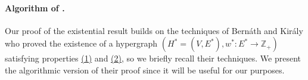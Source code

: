 \documentclass{article}
\def\Cref#1{<#1>}%
\newcommand{\maximalTightSetFamily}[1]{\ensuremath{\calT_{#1}}\xspace}
\newcommand{\shubhang}[1]{{\color{blue}[{\tiny Shubhang: \bf #1}]\marginpar{\color{blue}*}}}
\providecommand{\Z}{\mathbb{Z}}
\providecommand{\calT}{\mathcal{T}}
\begin{document}



\paragraph{Algorithm of \cite{Bernath-Kiraly}.} Our proof of the existential result builds on the techniques of Bern\'{a}th and Kir\'{a}ly \cite{Bernath-Kiraly} who proved the existence of a hypergraph $(H^*=(V, E^*), w^*: E^*\rightarrow \Z_+)$ satisfying properties \hyperlink{WeakToStrong(1)}{(1)} and \hyperlink{WeakToStrong(2)}{(2)}, so we briefly recall their techniques. 
We present the algorithmic version of their proof since it will be useful for our purposes. 
\end{document}
